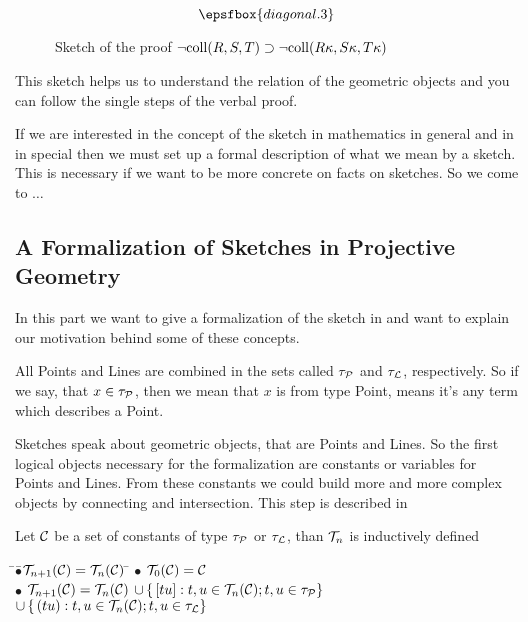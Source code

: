 \begin{figure}[ht]
  \[\epsfbox{diagonal.3}\]
  \caption{Sketch of the proof
        $\lnot\mathrm{coll}(R,S,T)\supset\lnot\mathrm{coll}(R\kappa, S\kappa, T\kappa)$}
  \label{skizze:proof1}
\end{figure}

This sketch helps us to understand the relation of the geometric
objects and you can follow the single steps of the verbal proof.

If we are interested in the concept of the sketch in mathematics in
general and in \pg in special then we must set up a formal description
of what we mean by a sketch. This is necessary if we want to be more
concrete on facts on sketches. So we come to $\ldots$

%
\subsection{A Formalization of Sketches in
Projective Geometry\label{:sketch:formalisation}}

In this part we want to give a formalization of the
sketch in \pg and
want to explain our motivation behind some of these concepts.

All Points and Lines are combined in the sets called
$\typpo$ and $\typli$, respectively. So if we say, that $x\in\typpo$,
then we mean that $x$ is from type Point, means it's any term which
describes a Point.

Sketches speak about geometric objects, that are Points and Lines. So
the first logical objects necessary for the formalization are
constants or variables for Points and Lines. From these constants we
could build more and more complex objects by connecting and
intersection. This step is described in

\begin{definition}\label{definition:terms}
Let $\cC$ be a set of constants of type $\typpo$ or $\typli$, than
$\cT_n$ is inductively defined
\begin{tabbing}
\qquad\=$\bullet$\quad\=$\cT_{n+1}(\cC) = \cT_n(\cC)\ $\=\kill
\> $\bullet$ \> $\cT_0(\cC) = \cC$\\
\> $\bullet$ \> $\cT_{n+1}(\cC) = \cT_n(\cC)$ \>
         $\cup\, \{\,[tu] : t,u\in\cT_n(\cC); t,u\in\typpo\}$\\
\>\>\>     $\cup\, \{\,(tu) : t,u\in\cT_n(\cC); t,u\in\typli\}$
\end{tabbing}
\end{definition}

